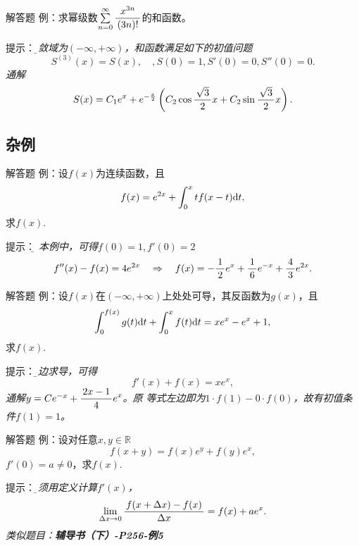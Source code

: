 \begin{frame}{解答题}
	\linespread{1.2}
	\alert{例：}求幂级数$\sumn[0]\df{x^{3n}}{(3n)!}$的和函数。
	
	\pause\alert{提示：}\it\b 
	收敛域为$(-\infty,+\infty)$，和函数满足如下的初值问题
	$$S^{(3)}(x)=S(x),\quad,S(0)=1,S'(0)=0,S''(0)=0.$$
	通解
	$$S(x)=C_1e^x+e^{-\frac x2}\left(C_2\cos\df{\sqrt3}2x
	+C_2\sin\df{\sqrt3}2x\right).$$
\end{frame}

% 	

\subsection{杂例}

\begin{frame}{解答题}
	\linespread{1.2}
	\alert{例：}设$f(x)$为连续函数，且
	$$f(x)=e^{2x}+\dint_0^xtf(x-t)\d t,$$
	求$f(x)$.
	
	\pause\alert{提示：}\it\b {}
	\pause 本例中，可得$f(0)=1,f'(0)=2$\pause  
	$$f''(x)-f(x)=4e^{2x}\quad\Rightarrow\quad 
	f(x)=-\df12e^x+\df16e^{-x}+\df43e^{2x}.$$
\end{frame}

\begin{frame}{解答题}
	\linespread{1.2}
	\alert{例：}设$f(x)$在$(-\infty,+\infty)$上处处可导，其反函数为$g(x)$，且
	$$\dint_0^{f(x)}g(t)\d t+\dint_0^xf(t)\d t=xe^x-e^x+1,$$
	求$f(x)$.
	
	\pause\alert{提示：}\it\b 两边求导，可得
	$$f'(x)+f(x)=xe^x,$$
	通解$y=Ce^{-x}+\df{2x-1}4e^x$。\pause 原
	等式左边即为$1\cdot f(1)-0\cdot f(0)$，故有初值条件$f(1)=1$。
\end{frame}

\begin{frame}{解答题}
	\linespread{1.2}
	\alert{例：}设对任意$x,y\in\mathbb{R}$
	$$f(x+y)=f(x)e^y+f(y)e^x,$$
	$f'(0)=a\ne 0$，求$f(x)$.
	
	\pause\alert{提示：}\it\b 必须用定义计算$f'(x)$，
	$$\lim\limits_{\Delta x\to 0}\df{f(x+\Delta x)-f(x)}{\Delta x}
	=f(x)+ae^x.$$
	\pause 类似题目：\alert{\bf 辅导书（下）-P256-例5}
\end{frame}

